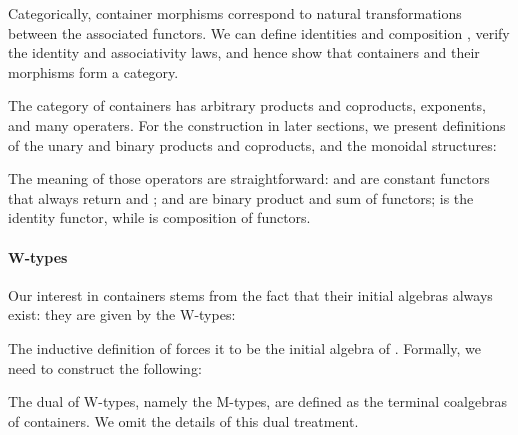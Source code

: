 Categorically, container morphisms correspond to natural transformations between the associated functors. We can define identities  and composition , verify the identity and associativity laws, and hence show that containers and their morphisms form a category.

The category of containers has arbitrary products and coproducts, exponents, and many operaters. For the construction in later sections, we present definitions of the unary and binary products and coproducts, and the monoidal structures:



The meaning of those operators are straightforward:  and  are constant functors that always return  and ;  and  are binary product and sum of functors;  is the identity functor, while  is composition of functors.

\paragraph*{W-types}

Our interest in containers stems from the fact that their initial algebras always exist: they are given by the W-types:



 The inductive definition of  forces it to be the initial algebra of \;\;. Formally, we need to construct the following:



The dual of W-types, namely the M-types, are defined as the terminal coalgebras of containers. We omit the details of this dual treatment.
